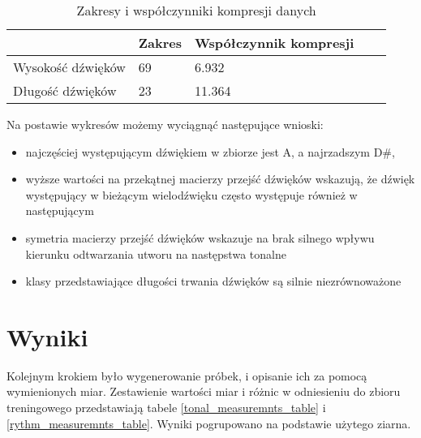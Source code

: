 {{        %
        \begin{table}
            \begin{center}
                \begin{tabular}{ |p{2.5cm}|p{2.5cm}|p{2.5cm}|p{2.5cm}|p{2.5cm}| }
                \hline
                 & Zakres & Współczynnik kompresji \\ 
                \hline
                Wysokość dźwięków & 69 & 6.932 \\  
                \hline
                Długość dźwięków & 23 & 11.364 \\
                \hline
                \end{tabular}
            \end{center}
            \caption{Zakresy i współczynniki kompresji danych} \label{range_and_compression}
        \end{table}

        Na postawie wykresów możemy wyciągnąć następujące wnioski:
        \begin{itemize}
            \item najczęściej występującym dźwiękiem w zbiorze jest A, a najrzadszym D\#,
            \item wyższe wartości na przekątnej macierzy przejść dźwięków wskazują, że dźwięk występujący w bieżącym wielodźwięku
            często występuje również w następującym
            \item symetria macierzy przejść dźwięków wskazuje na brak silnego wpływu kierunku odtwarzania utworu na następstwa tonalne
            \item klasy przedstawiające długości trwania dźwięków są silnie niezrównoważone
        \end{itemize}
    }

    \section{Wyniki}
    {
        Kolejnym krokiem było wygenerowanie próbek, i opisanie ich za pomocą wymienionych miar. Zestawienie wartości miar i różnic
        w odniesieniu do zbioru treningowego przedstawiają tabele \ref{tonal_measuremnts_table} i \ref{rythm_measuremnts_table}. Wyniki pogrupowano na podstawie użytego ziarna.

}}
